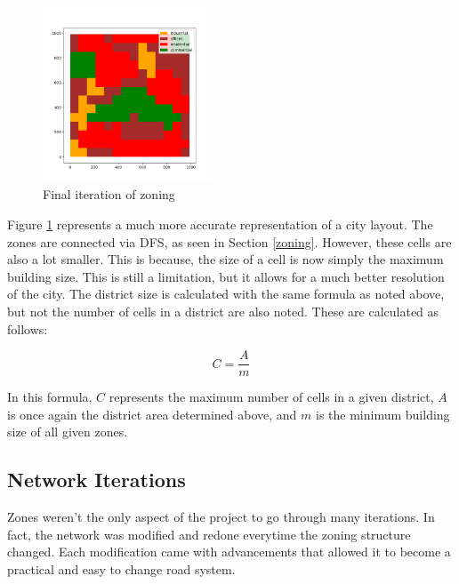 \documentclass[11pt]{article}
\begin{document}
\begin{multicols}{2}
    \begin{figure}[H]
        \centering
        \vspace{-1em}
        \includegraphics[width=0.45\textwidth]{images/finalzoning.png}
        \caption{Final iteration of zoning}
        \label{fig:final-zoning}
    \end{figure}

    \quad Figure \ref{fig:final-zoning} represents a much more accurate representation of a city layout. The zones are connected via DFS, as seen in Section \ref{zoning}. However, these cells are also a lot smaller. This is because, the size of a cell is now simply the maximum building size. This is still a limitation, but it allows for a much better resolution of the city. The district size is calculated with the same formula as noted above, but not the number of cells in a district are also noted. These are calculated as follows:

    \[C = \frac{A}{m}\]

    In this formula, $C$ represents the maximum number of cells in a given district, $A$ is once again the district area determined above, and $m$ is the minimum building size of all given zones.

    \subsection{Network Iterations}

    \quad Zones weren't the only aspect of the project to go through many iterations. In fact, the network was modified and redone everytime the zoning structure changed. Each modification came with advancements that allowed it to become a practical and easy to change road system.


\end{multicols}
\end{document}
